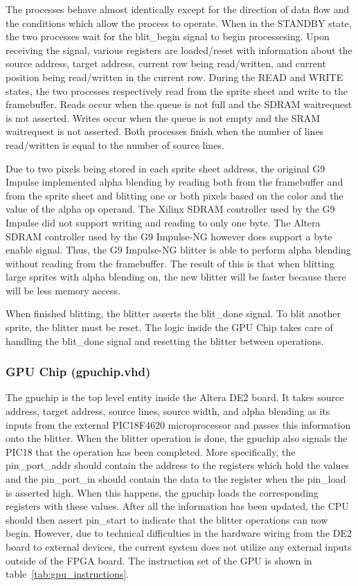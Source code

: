 \documentclass{report}
\begin{document}
The processes behave almost identically except for the direction of data
flow and the conditions which allow the process to operate. When in the
STANDBY state, the two processes wait for the blit\_begin signal to
begin processesing. Upon receiving the signal, various registers are
loaded/reset with information about the source address, target address,
current row being read/written, and current position being read/written
in the current row. During the READ and WRITE states, the two processes
respectively read from the sprite sheet and write to the framebuffer.
Reads occur when the queue is not full and the SDRAM waitrequest is not
asserted. Writes occur when the queue is not empty and the SRAM
waitrequest is not asserted. Both processes finish when the number of
lines read/written is equal to the number of source lines.

Due to two pixels being stored in each sprite sheet address, the
original G9 Impulse implemented alpha blending by reading both from the
framebuffer and from the sprite sheet and blitting one or both pixels
based on the color and the value of the alpha op operand. The Xilinx
SDRAM controller used by the G9 Impulse did not support writing and
reading to only one byte. The Altera SDRAM controller used by the G9
Impulse-NG however does support a byte enable signal. Thus, the G9
Impulse-NG blitter is able to perform alpha blending without reading
from the framebuffer. The result of this is that when blitting large
sprites with alpha blending on, the new blitter will be faster because
there will be less memory access.

When finished blitting, the blitter asserts the blit\_done signal. To
blit another sprite, the blitter must be reset. The logic inside the
GPU Chip takes care of handling the blit\_done signal and resetting the
blitter between operations.

\subsubsection{GPU Chip (gpuchip.vhd)}
The gpuchip is the top level entity inside the Altera DE2 board. It 
takes source address, target address, source lines, source width, and 
alpha blending as its inputs from the external PIC18F4620 microprocessor 
and passes this information onto the blitter. When the blitter operation 
is done, the gpuchip also signals the PIC18 that the operation has been 
completed. More specifically, the pin\_port\_addr should contain the 
address to the registers which hold the values and the pin\_port\_in 
should contain the data to the register when the pin\_load is asserted 
high. When this happens, the gpuchip loads the corresponding registers 
with these values. After all the information has been updated, the CPU 
should then assert pin\_start to indicate that the blitter operations can 
now begin. However, due to technical difficulties in the hardware wiring 
from the DE2 board to external devices, the current system does not 
utilize any external inputs outside of the FPGA board. The instruction
set of the GPU is shown in table~\ref{tab:gpu_instructions}.
\end{document}
